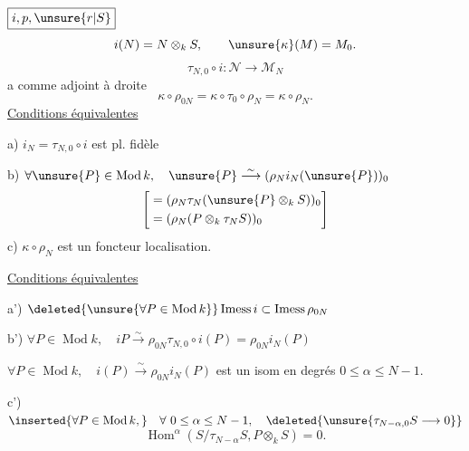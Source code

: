 \(\boxed{i,p,\unsure{r|S}}\)
\[
i(N)=N\otimes_kS,\qquad\unsure{\kappa}(M)=M_0.
\]
\[
\tau_{N,0}\circ i:\mathcal N\longrightarrow\mathcal M_N
\]
a comme adjoint à droite
\[
\kappa\circ\rho_{0N}=\kappa\circ\tau_0\circ\rho_N=\kappa\circ\rho_N.
\]
\uline{Conditions équivalentes}

 a) \(i_N=\tau_{N,0}\circ i\) est pl. fidèle

 b) \(\forall\unsure{P}\in\operatorname{Mod}k,\quad
 \unsure{P}\overset\sim\longrightarrow(\rho_Ni_N(\unsure{P}))_0\)
\[
\left[\begin{aligned}
&=(\rho_N\tau_N(\unsure{P}\otimes_k S))_0\\
&=(\rho_N(P\otimes_k\tau_NS))_0
\end{aligned}\right]
\]
 c) \(\kappa\circ\rho_N\) est un foncteur localisation.


\uline{Conditions équivalentes}

 a') \(\deleted{\unsure{\forall P\in\operatorname{Mod}k}}
 \operatorname{Imess}i\subset\operatorname{Imess}\rho_{0N}\)

 b') \(\forall P\in\operatorname{Mod}k,\quad
 iP\overset\sim\longrightarrow\rho_{0N}\tau_{N,0}\circ i(P)
 =\rho_{0N}i_N(P)\)

  \(\forall P\in\operatorname{Mod}k,\quad
 i(P)\overset\sim\longrightarrow\rho_{0N}i_N(P)\) est un isom en degrés
 \(0\leq\alpha\leq N-1\).

 c') \(\inserted{\forall P\in\operatorname{Mod}k,}\quad
 \forall\ 0\leq\alpha\leq N-1,\quad
 \deleted{\unsure{\tau_{N-\alpha,0}S\longrightarrow0}}\)
\[
\operatorname{Hom}^\alpha(S/\tau_{N-\alpha}S,P\otimes_kS)=0.
\]
